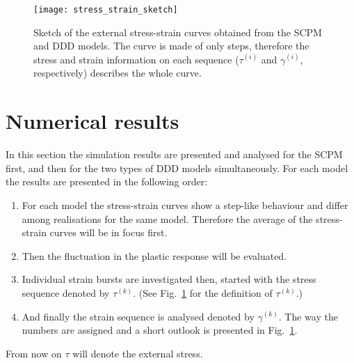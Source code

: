   
\begin{figure}[htbp!] 
\centering    
\texttt{[image: stress\_strain\_sketch]}
\caption[Stress-strain curve sketch]{Sketch of the external stress-strain curves obtained from the SCPM and DDD models. The curve is made of only steps, therefore the stress and strain information on each sequence (${\tau ^{\left( i \right)}}$ and ${\gamma ^{\left( i \right)}}$, respectively) describes the whole curve.}
\label{fig:weakest_stress_strain_sketch}
\end{figure}

\section{Numerical results} \label{sec:weakest_numerical_results}
In this section the simulation results are presented and analysed for the SCPM first, and then for the two types of DDD models simultaneously. For each model the results are presented in the following order:
\begin{enumerate}
\item For each model the stress-strain curves show a step-like behaviour and differ among realisations for the same model. Therefore the average of the stress-strain curves will be in focus first.
\item Then the fluctuation in the plastic response will be evaluated.
\item Individual strain bursts are investigated then, started with the stress sequence denoted by ${\tau ^{\left( k \right)}}$. (See Fig.~\ref{fig:weakest_stress_strain_sketch} for the definition of ${\tau ^{\left( k \right)}}$.)
\item And finally the strain sequence is analysed denoted by ${\gamma ^{\left( k \right)}}$. The way the numbers are assigned and a short outlook is presented in Fig.~\ref{fig:weakest_stress_strain_sketch}.
\end{enumerate}
From now on $\tau$ will denote the external stress.


